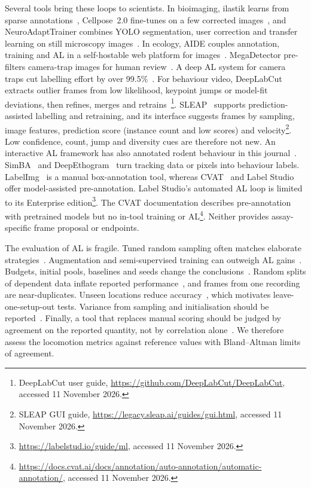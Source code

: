 \documentclass[pdflatex,sn-basic,Numbered]{sn-jnl}
\theoremstyle{thmstyleone}%
\begin{document}
Several tools bring these loops to scientists. In bioimaging, ilastik learns from sparse annotations~\cite{berg2019ilastik}, Cellpose~2.0 fine-tunes on a few corrected images~\cite{pachitariu2022cellpose}, and NeuroAdaptTrainer combines YOLO segmentation, user correction and transfer learning on still microscopy images~\cite{erasocasas2026neuroadapttrainer}. In ecology, AIDE couples annotation, training and AL in a self-hostable web platform for images~\cite{kellenberger2020aide}. MegaDetector pre-filters camera-trap images for human review~\cite{beery2019efficient,beery2019automating}. A deep AL system for camera traps cut labelling effort by over 99.5\%~\cite{norouzzadeh2021deep}. For behaviour video, DeepLabCut~\cite{mathis2018deeplabcut} extracts outlier frames from low likelihood, keypoint jumps or model-fit deviations, then refines, merges and retrains~\cite{nath2019using}\footnote{DeepLabCut user guide, \url{https://github.com/DeepLabCut/DeepLabCut}, accessed 11 November 2026.}. SLEAP~\cite{pereira2022sleap} supports prediction-assisted labelling and retraining, and its interface suggests frames by sampling, image features, prediction score (instance count and low scores) and velocity\footnote{SLEAP GUI guide, \url{https://legacy.sleap.ai/guides/gui.html}, accessed 11 November 2026.}. Low confidence, count, jump and diversity cues are therefore not new. An interactive AL framework has also annotated rodent behaviour in this journal~\cite{lorbach2019interactive}. SimBA~\cite{goodwin2024simple} and DeepEthogram~\cite{bohnslav2021deepethogram} turn tracking data or pixels into behaviour labels. LabelImg~\cite{tzutalin2015labelimg} is a manual box-annotation tool, whereas CVAT~\cite{cvat2023computer} and Label Studio~\cite{tkachenko2020label} offer model-assisted pre-annotation. Label Studio's automated AL loop is limited to its Enterprise edition\footnote{\url{https://labelstud.io/guide/ml}, accessed 11 November 2026.}. The CVAT documentation describes pre-annotation with pretrained models but no in-tool training or AL\footnote{\url{https://docs.cvat.ai/docs/annotation/auto-annotation/automatic-annotation/}, accessed 11 November 2026.}. Neither provides assay-specific frame proposal or endpoints.

The evaluation of AL is fragile. Tuned random sampling often matches elaborate strategies~\cite{munjal2022towards}. Augmentation and semi-supervised training can outweigh AL gains~\cite{mittal2019parting}. Budgets, initial pools, baselines and seeds change the conclusions~\cite{luth2023navigating}. Random splits of dependent data inflate reported performance~\cite{kapoor2023leakage,roberts2017crossvalidation}, and frames from one recording are near-duplicates. Unseen locations reduce accuracy~\cite{beery2018recognition}, which motivates leave-one-setup-out tests. Variance from sampling and initialisation should be reported~\cite{bouthillier2021accounting}. Finally, a tool that replaces manual scoring should be judged by agreement on the reported quantity, not by correlation alone~\cite{bland1986statistical}. We therefore assess the locomotion metrics against reference values with Bland--Altman limits of agreement.
\end{document}

